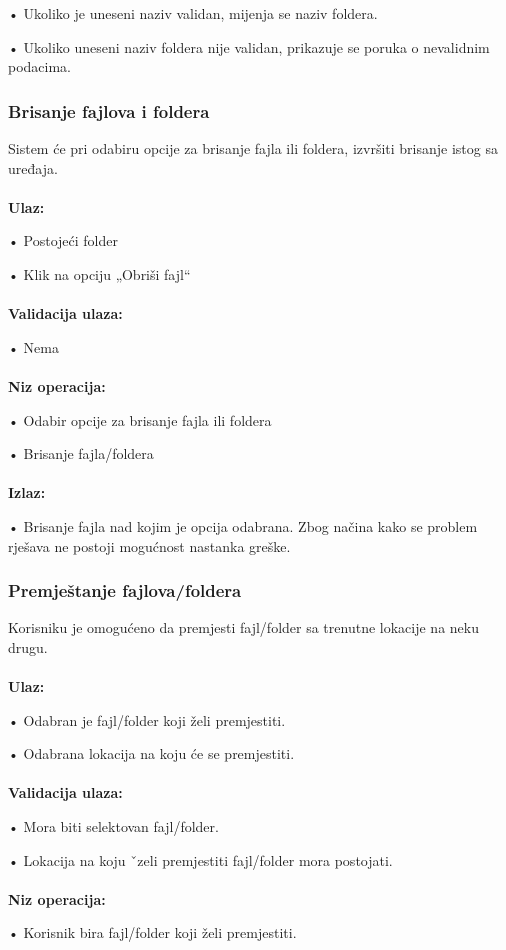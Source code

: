\documentclass[12pt]{article}
\begin{document}
•	Ukoliko je uneseni naziv validan, mijenja se naziv foldera.

•	Ukoliko uneseni naziv foldera nije validan, prikazuje se poruka o nevalidnim podacima.

\subsubsection{Brisanje fajlova i foldera}

Sistem će pri odabiru opcije za brisanje fajla ili foldera, izvršiti brisanje istog sa uređaja.\\ \\
\textbf{Ulaz:}

•	Postojeći folder

•	Klik na opciju  „Obriši fajl“\\ \\
\textbf{Validacija ulaza:}

•	Nema\\ \\
\textbf{Niz  operacija:}

•	Odabir opcije za brisanje fajla ili foldera

•	Brisanje fajla/foldera\\ \\
\textbf{Izlaz:}

•	Brisanje fajla nad kojim je opcija odabrana. Zbog načina kako se problem rješava ne postoji mogućnost nastanka greške.

\subsubsection{Premještanje fajlova/foldera}

Korisniku je omogućeno da premjesti fajl/folder sa trenutne lokacije na neku drugu.\\ \\
\textbf{Ulaz:}

•	Odabran je fajl/folder koji želi premjestiti. 

•	Odabrana lokacija na koju će se premjestiti.\\ \\
\textbf{Validacija ulaza:}

•	Mora biti selektovan fajl/folder.
 
•	Lokacija na koju ˇzeli premjestiti fajl/folder mora postojati.\\ \\
\textbf{Niz operacija:}

•	Korisnik bira fajl/folder koji želi premjestiti.
\end{document}
